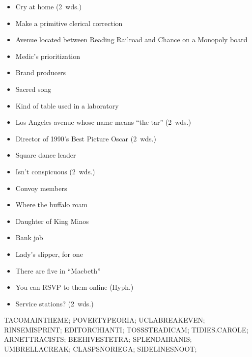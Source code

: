 {\begin{itemize}
        Decathlon event
      \item
        Cry at home (2~wds.)
    \end{itemize}
  \item
    \begin{itemize}
      \item
        Make a primitive clerical correction
      \item
        Avenue located between Reading Railroad and Chance on a Monopoly board
      \item
        Medic's prioritization
      \item
        Brand producers
      \item
        Sacred song
      \item
        Kind of table used in a laboratory
    \end{itemize}
  \item
    \begin{itemize}
      \item
        Los Angeles avenue whose name means ``the tar'' (2~wds.)
      \item
        Director of 1990's Best Picture Oscar (2~wds.)
      \item
        Square dance leader
      \item
        Isn't conspicuous (2~wds.)
    \end{itemize}
  \item
    \begin{itemize}
      \item
        Convoy members
      \item
        Where the buffalo roam
      \item
        Daughter of King Minos
      \item
        Bank job
    \end{itemize}
  \item
    \begin{itemize}
      \item
        Lady's slipper, for one
      \item
        There are five in ``Macbeth''
      \item
        You can RSVP to them online (Hyph.)
    \end{itemize}
  \item
    \begin{itemize}
      \item
        Service stations? (2~wds.)
    \end{itemize}
}{%
  \puzzlerow TACOMAINTHEME;
  \puzzlerow POVERTYPEORIA;
  \puzzlerow UCLABREAKEVEN;
  \puzzlerow RINSEMISPRINT;
  \puzzlerow EDITORCHIANTI;
  \puzzlerow TOSSSTEADICAM;
  \puzzlerow TIDIES.CAROLE;
  \puzzlerow ARNETTRACISTS;
  \puzzlerow BEEHIVESTETRA;
  \puzzlerow SPLENDAIRANIS;
  \puzzlerow UMBRELLACREAK;
  \puzzlerow CLASPSNORIEGA;
  \puzzlerow SIDELINESNOOT;
}
